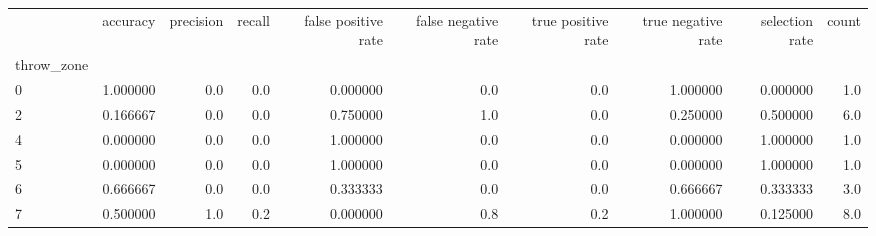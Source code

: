 \begin{tabular}{lrrrrrrrrr}
\toprule
{} &  accuracy &  precision &  recall &  false positive rate &  false negative rate &  true positive rate &  true negative rate &  selection rate &  count \\
throw\_zone &           &            &         &                      &                      &                     &                     &                 &        \\
\midrule
0          &  1.000000 &        0.0 &     0.0 &             0.000000 &                  0.0 &                 0.0 &            1.000000 &        0.000000 &    1.0 \\
2          &  0.166667 &        0.0 &     0.0 &             0.750000 &                  1.0 &                 0.0 &            0.250000 &        0.500000 &    6.0 \\
4          &  0.000000 &        0.0 &     0.0 &             1.000000 &                  0.0 &                 0.0 &            0.000000 &        1.000000 &    1.0 \\
5          &  0.000000 &        0.0 &     0.0 &             1.000000 &                  0.0 &                 0.0 &            0.000000 &        1.000000 &    1.0 \\
6          &  0.666667 &        0.0 &     0.0 &             0.333333 &                  0.0 &                 0.0 &            0.666667 &        0.333333 &    3.0 \\
7          &  0.500000 &        1.0 &     0.2 &             0.000000 &                  0.8 &                 0.2 &            1.000000 &        0.125000 &    8.0 \\
\bottomrule
\end{tabular}
